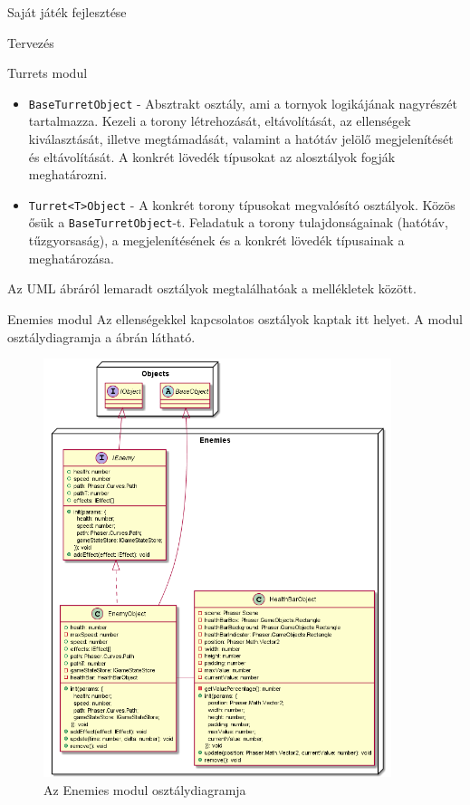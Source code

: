 \begin{MyChapter}{Saját játék fejlesztése}
\begin{MySection}{Tervezés}
\begin{MySubSection}{Turrets modul}
\begin{itemize}
				\item \texttt{BaseTurretObject} - Absztrakt osztály, ami a tornyok logikájának nagyrészét tartalmazza. Kezeli a torony létrehozását, eltávolítását, az ellenségek kiválasztását, illetve megtámadását, valamint a hatótáv jelölő megjelenítését és eltávolítását. A konkrét lövedék típusokat az alosztályok fogják meghatározni.
				
				\item \texttt{Turret<T>Object} - A konkrét torony típusokat megvalósító osztályok. Közös ősük a \texttt{BaseTurretObject}-t. Feladatuk a torony tulajdonságainak (hatótáv, tűzgyorsaság), a megjelenítésének és a konkrét lövedék típusainak a meghatározása.
				
			\end{itemize}
			
			Az UML ábráról lemaradt osztályok megtalálhatóak a mellékletek között.
		\end{MySubSection}

		\begin{MySubSection}{Enemies modul}
			Az ellenségekkel kapcsolatos osztályok kaptak itt helyet.
			A modul osztálydiagramja a  ábrán látható.
				
			\begin{figure}[h!]
				\centering
				\includegraphics[width=0.906\textwidth]{kepek/uml/enemies/enemy.png}
				\caption{Az Enemies modul osztálydiagramja}
				\label{fig:uml:enemy}
			\end{figure}
			

\end{MySubSection}
\end{MySection}
\end{MyChapter}
